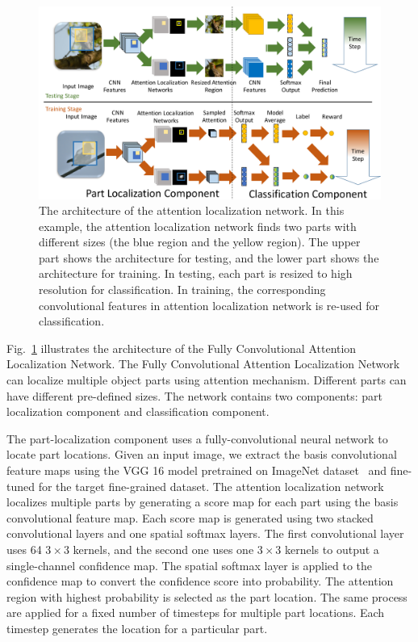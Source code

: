 \documentclass[runningheads]{llncs}
\begin{document}
\begin{figure}[!t]
\begin{center}
\includegraphics[width=4.8in]{1.pdf}
\end{center}
\caption{The architecture of the attention localization network. In this example, the attention localization network finds two parts with different sizes (the blue region and the yellow region).
The upper part shows the architecture for testing, and the lower part shows the architecture for training. In testing, each part is resized to high resolution for classification.
In training, the corresponding convolutional features in attention localization network is re-used for classification.
}\label{fig:architecture}
\vspace{-8pt}
\end{figure}

Fig.~\ref{fig:architecture} illustrates the architecture of the Fully Convolutional Attention Localization Network.
The Fully Convolutional Attention Localization Network can localize multiple object parts using attention mechanism.
Different parts can have different pre-defined sizes.
The network contains two components: part localization component and classification component.

The part-localization component uses a fully-convolutional neural network to locate part locations.
Given an input image, we extract the basis convolutional feature maps using the VGG 16 model \cite{bd8} pretrained on ImageNet dataset~\cite{bd19} and fine-tuned for the target fine-grained dataset.
The attention localization network localizes multiple parts by generating a score map for each part using  the basis convolutional feature map.
Each score map is generated using two stacked convolutional layers and one spatial softmax layers.
The first convolutional layer uses 64 $3\times3$ kernels, and the second one uses one $3\times3$ kernels to output a single-channel confidence map.
The spatial softmax layer is applied to the confidence map to convert the confidence score into probability.
The attention region with highest probability is selected as the part location.
The same process are applied for a fixed number of timesteps for multiple part locations.
Each timestep generates the location for a particular part.
\end{document}
